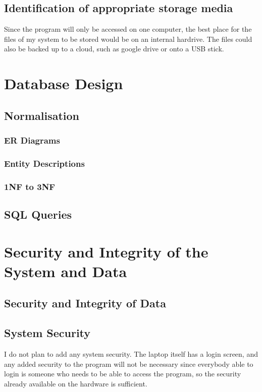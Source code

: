 \subsection{Identification of appropriate storage media}
Since the program will only be accessed on one computer, the best place for the files of my system to be stored would be on an internal hardrive. The files could also be backed up to a cloud, such as google drive or onto a USB stick.
\section{Database Design}

\subsection{Normalisation}

\subsubsection{ER Diagrams}

\subsubsection{Entity Descriptions}

\subsubsection{1NF to 3NF}

\subsection{SQL Queries}

\section{Security and Integrity of the System and Data}

\subsection{Security and Integrity of Data}


\subsection{System Security}
I do not plan to add any system security. The laptop itself has a login screen, and any added security to the program will not be necessary since everybody able to login is someone who needs to be able to access the program, so the security already available on the hardware is sufficient. 
